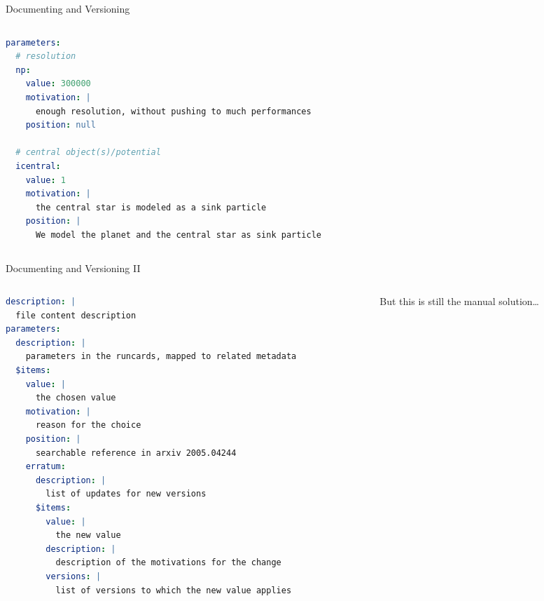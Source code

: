 \documentclass[9pt]{beamer}
\begin{document}
\begin{frame}[fragile]{Documenting and Versioning}
\begin{columns}
\begin{column}{0.5\textwidth}
\begin{lstlisting}[style=mystyle, language=yaml, breaklines=true, caption={
                Excerpt from the \texttt{describe-setup.yaml} file
            }]
parameters:
  # resolution
  np:
    value: 300000
    motivation: |
      enough resolution, without pushing to much performances
    position: null

  # central object(s)/potential
  icentral:
    value: 1
    motivation: |
      the central star is modeled as a sink particle
    position: |
      We model the planet and the central star as sink particle
\end{lstlisting}
        \end{column}
    \end{columns}
\end{frame}

\begin{frame}[fragile]{Documenting and Versioning II}
    \begin{columns}
        \begin{column}{0.5\textwidth}
            \begin{lstlisting}[language=yaml, style=mystyle, breaklines=true, caption={
                The \texttt{describe-schema.yaml} file
            }]
description: |
  file content description
parameters:
  description: |
    parameters in the runcards, mapped to related metadata
  $items:
    value: |
      the chosen value
    motivation: |
      reason for the choice
    position: |
      searchable reference in arxiv 2005.04244
    erratum:
      description: |
        list of updates for new versions
      $items:
        value: |
          the new value
        description: |
          description of the motivations for the change
        versions: |
          list of versions to which the new value applies
\end{lstlisting}
        \end{column}
        \begin{column}{0.5\textwidth}
            But this is still the manual solution\dots
        \end{column}
    \end{columns}
\end{frame}
\end{document}
